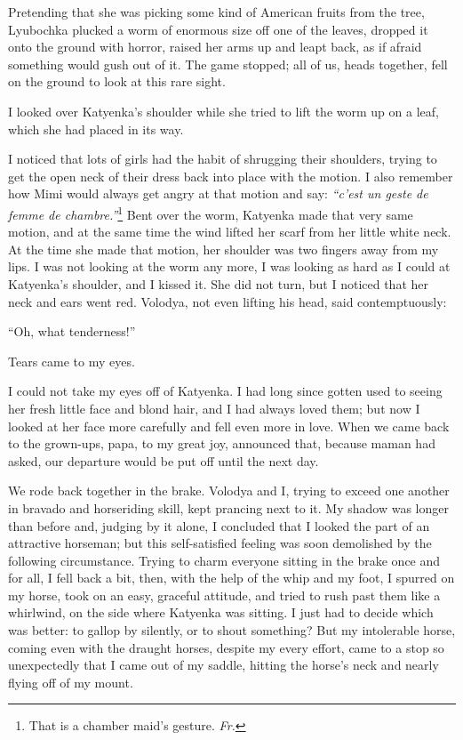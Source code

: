 Pretending that she was picking some kind of American fruits from the tree, Lyubochka plucked a worm of enormous size off one of the leaves, dropped it onto the ground with horror, raised her arms up and leapt back, as if afraid something would gush out of it. The game stopped; all of us, heads together, fell on the ground to look at this rare sight.

I looked over Katyenka's shoulder while she tried to lift the worm up on a leaf, which she had placed in its way.

I noticed that lots of girls had the habit of shrugging their shoulders, trying to get the open neck of their dress back into place with the motion. I also remember how Mimi would always get angry at that motion and say: \textit{``c'est un geste de femme de chambre.''}\footnote{That is a chamber maid's gesture. \textit{Fr.}} Bent over the worm, Katyenka made that very same motion, and at the same time the wind lifted her scarf from her little white neck. At the time she made that motion, her shoulder was two fingers away from my lips. I was not looking at the worm any more, I was looking as hard as I could at Katyenka's shoulder, and I kissed it. She did not turn, but I noticed that her neck and ears went red. Volodya, not even lifting his head, said contemptuously:

``Oh, what tenderness!'' %

Tears came to my eyes.

I could not take my eyes off of Katyenka. I had long since gotten used to seeing her fresh little face and blond hair, and I had always loved them; but now I looked at her face more carefully and fell even more in love. When we came back to the grown-ups, papa, to my great joy, announced that, because maman had asked, our departure would be put off until the next day.

We rode back together in the brake. Volodya and I, trying to exceed one another in bravado and horseriding skill, kept prancing next to it. My shadow was longer than before and, judging by it alone, I concluded that I looked the part of an attractive horseman; but this self-satisfied feeling was soon demolished by the following circumstance. Trying to charm everyone sitting in the brake once and for all, I fell back a bit, then, with the help of the whip and my foot, I spurred on my horse, took on an easy, graceful attitude, and tried to rush past them like a whirlwind, on the side where Katyenka was sitting. I just had to decide which was better: to gallop by silently, or to shout something? But my intolerable horse, coming even with the draught horses, despite my every effort, came to a stop so unexpectedly that I came out of my saddle, hitting the horse's neck and nearly flying off of my mount.

